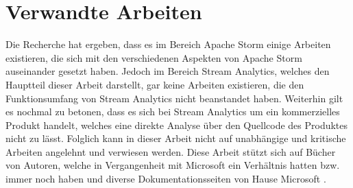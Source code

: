 \section{Verwandte Arbeiten}
Die Recherche hat ergeben, dass es im Bereich Apache Storm einige Arbeiten existieren, die sich mit den verschiedenen Aspekten von Apache Storm auseinander gesetzt haben. Jedoch im Bereich Stream Analytics, welches den Hauptteil dieser Arbeit darstellt, gar keine Arbeiten existieren, die den Funktionsumfang von Stream Analytics nicht beanstandet haben. Weiterhin gilt es nochmal zu betonen, dass es sich bei Stream Analytics um ein kommerzielles Produkt handelt, welches eine direkte Analyse über den Quellcode des Produktes nicht zu lässt. Folglich kann in dieser Arbeit nicht auf unabhängige und kritische Arbeiten angelehnt und verwiesen werden. Diese Arbeit stützt sich auf Bücher von Autoren, welche in Vergangenheit mit Microsoft ein Verhältnis hatten bzw. immer noch haben und diverse Dokumentationsseiten von Hause Microsoft \cite{Familiar.2017} \cite{Klein.2017}. 